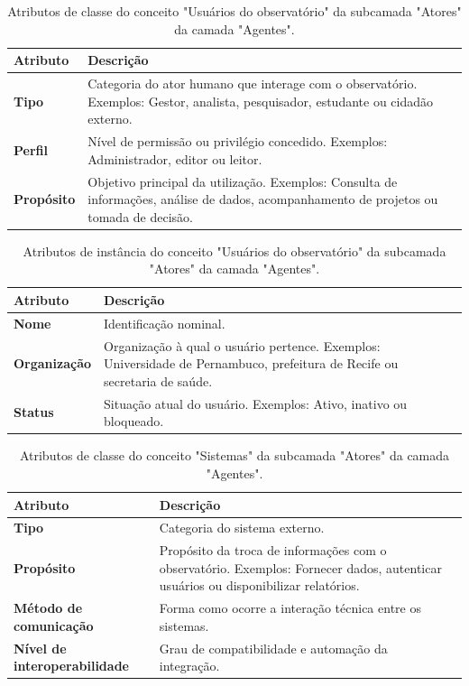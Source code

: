 \begin{apendicesenv}
\begin{table}[H]
\centering
\caption{Atributos de classe do conceito "Usuários do observatório" da subcamada "Atores" da camada "Agentes".}
\begin{tabularx}{\textwidth}{|l|X|X|}
\hline
\textbf{Atributo} & \textbf{Descrição} \\ \hline
\textbf{Tipo} & Categoria do ator humano que interage com o observatório. Exemplos: Gestor, analista, pesquisador, estudante ou cidadão externo. \\ \hline
\textbf{Perfil} & Nível de permissão ou privilégio concedido. Exemplos: Administrador, editor ou leitor. \\ \hline
\textbf{Propósito} & Objetivo principal da utilização. Exemplos: Consulta de informações, análise de dados, acompanhamento de projetos ou tomada de decisão. \\ \hline
\end{tabularx}
\end{table}

\begin{table}[H]
\centering
\caption{Atributos de instância do conceito "Usuários do observatório" da subcamada "Atores" da camada "Agentes".}
\begin{tabularx}{\textwidth}{|l|X|X|}
\hline
\textbf{Atributo} & \textbf{Descrição} \\ \hline
\textbf{Nome} & Identificação nominal. \\ \hline
\textbf{Organização} & Organização à qual o usuário pertence. Exemplos: Universidade de Pernambuco, prefeitura de Recife ou secretaria de saúde. \\ \hline
\textbf{Status} & Situação atual do usuário. Exemplos: Ativo, inativo ou bloqueado. \\ \hline
\end{tabularx}
\end{table}

\begin{table}[H]
\centering
\caption{Atributos de classe do conceito "Sistemas" da subcamada "Atores" da camada "Agentes".}
\begin{tabularx}{\textwidth}{|l|X|X|}
\hline
\textbf{Atributo} & \textbf{Descrição} \\ \hline
\textbf{Tipo} & Categoria do sistema externo.\\ \hline
\textbf{Propósito} & Propósito da troca de informações com o observatório. Exemplos: Fornecer dados, autenticar usuários ou disponibilizar relatórios. \\ \hline
\textbf{Método de comunicação} & Forma como ocorre a interação técnica entre os sistemas.\\ \hline
\textbf{Nível de interoperabilidade} & Grau de compatibilidade e automação da integração. \\ \hline
\end{tabularx}
\end{table}


\end{apendicesenv}
